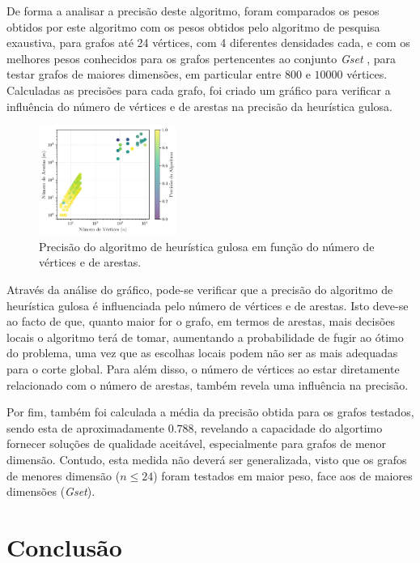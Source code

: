 \documentclass[mirror]{revdetua}
\begin{document}
De forma a analisar a precisão deste algoritmo, foram comparados os pesos obtidos por este algoritmo com os pesos obtidos pelo algoritmo de pesquisa exaustiva, para grafos até 24 vértices, com 4 diferentes densidades cada, e com os melhores pesos conhecidos para os grafos pertencentes ao conjunto \textit{Gset} \cite{GS24, ME19}, para testar grafos de maiores dimensões, em particular entre $800$ e $10000$ vértices. Calculadas as precisões para cada grafo, foi criado um gráfico para verificar a influência do número de vértices e de arestas na precisão da heurística gulosa.

\begin{figure}[h]
    \centering
    \includegraphics[width=0.4\textwidth]{../assets/precHEU.png}
    \caption{Precisão do algoritmo de heurística gulosa em função do número de vértices e de arestas.}
    \label{fig:precheu}
\end{figure}

Através da análise do gráfico, pode-se verificar que a precisão do algoritmo de heurística gulosa é influenciada pelo número de vértices e de arestas. Isto deve-se ao facto de que, quanto maior for o grafo, em termos de arestas, mais decisões locais o algoritmo terá de tomar, aumentando a probabilidade de fugir ao ótimo do problema, uma vez que as escolhas locais podem não ser as mais adequadas para o corte global. Para além disso, o número de vértices ao estar diretamente relacionado com o número de arestas, também revela uma influência na precisão.

Por fim, também foi calculada a média da precisão obtida para os grafos testados, sendo esta de aproximadamente $0.788$, revelando a capacidade do algortimo fornecer soluções de qualidade aceitável, especialmente para grafos de menor dimensão. Contudo, esta medida não deverá ser generalizada, visto que os grafos de menores dimensão ($n \leq 24$) foram testados em maior peso, face aos de maiores dimensões (\textit{Gset}).

\section{Conclusão}
\end{document}
